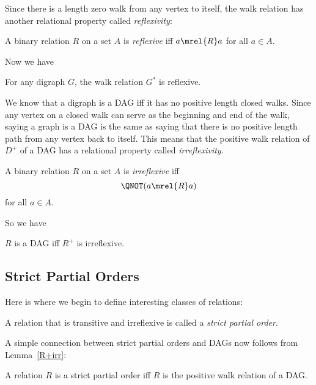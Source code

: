 Since there is a length zero walk from any vertex to itself, the walk
relation has another relational property called \emph{reflexivity}:

\begin{definition}
A binary relation $R$ on a set $A$ is \emph{reflexive}%
iff $a \mrel{R} a$ for all $a \in A$.
\end{definition}
Now we have
\begin{lemma}
For any digraph $G$, the walk relation $G^*$ is reflexive.
\end{lemma}

We know that a digraph is a DAG iff it has no positive length closed
walks.  Since any vertex on a closed walk can serve as the beginning
and end of the walk, saying a graph is a DAG is the same as saying
that there is no positive length path from any vertex back to itself.
\iffalse Lemma~\ref{shortestclosedwalk_lem} \fi This means that the
positive walk relation of $D^+$ of a DAG has a relational property
called \emph{irreflexivity}.

\begin{definition}
A binary relation $R$ on a set $A$ is
\emph{irreflexive} iff
\[
\QNOT(a \mrel{R} a)
\]
for all $a \in A$.
\end{definition}
So we have
\begin{lemma}\label{R+irr}
$R$ is a DAG iff $R^+$ is irreflexive.
\end{lemma}

\subsection{Strict Partial Orders}

Here is where we begin to define interesting classes of relations:

\begin{definition}%
A relation that is transitive and irreflexive is called a \emph{strict
  partial order}.
\end{definition}

A simple connection between strict partial orders and DAGs now follows
from Lemma~\ref{R+irr}:
\begin{theorem}\label{thm:SPOiffDAG}
A relation $R$ is a strict partial order iff $R$ is the positive walk
relation of a DAG.
\end{theorem}

